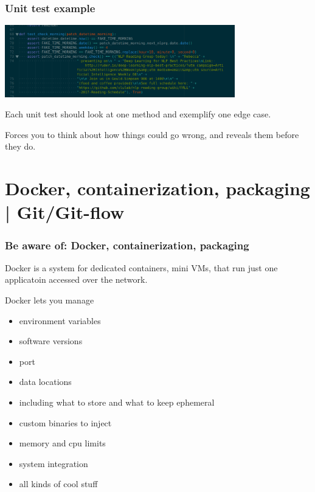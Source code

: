 \documentclass[10pt]{beamer}
\begin{document}
\begin{frame}[c]\frametitle{Unit test example}

    \centerline{\includegraphics[width=10cm]{figs/lingbottest.png}}

    \pause

    Each unit test should look at one method and exemplify one edge case.

    \pause

    Forces you to think about how things could go wrong, and reveals them before they do.

\end{frame}



















\section{Docker, containerization, packaging | Git/Git-flow}

\begin{frame}[c]\frametitle{Be aware of: Docker, containerization, packaging}

\pause

Docker is a system for dedicated containers, mini VMs, that run just one applicatoin accessed over the network.

Docker lets you manage

\begin{itemize}[<+->]
	\item environment variables
	\item software versions
	\item port
	\item data locations
	\item including what to store and what to keep ephemeral
	\item custom binaries to inject
	\item memory and cpu limits
	\item system integration
	\item all kinds of cool stuff
\end{itemize}

\end{frame}
\end{document}
